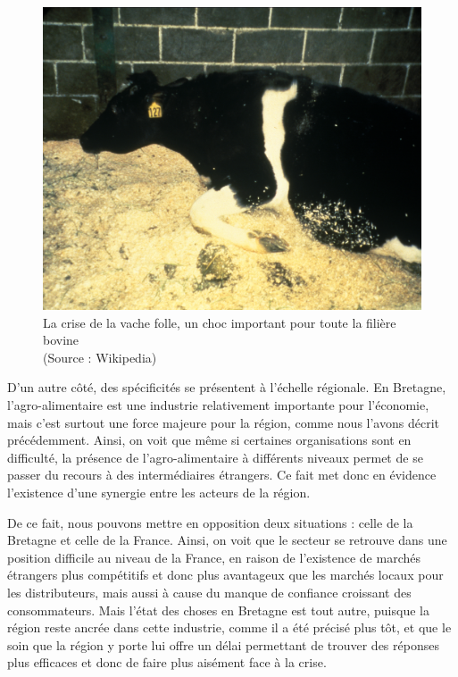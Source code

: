 \documentclass[a4paper,12pt]{report}
\begin{document}
			\begin{figure}[!h]
			\centering
			\includegraphics[scale=0.5]{Illustrations/VacheFolle.jpg}
			\caption{La crise de la vache folle, un choc important pour toute la filière bovine\\(Source : Wikipedia)}
			\label{VacheFolle}
			\end{figure}
			
			D’un autre côté, des spécificités se présentent à l’échelle régionale. En Bretagne, l’agro-alimentaire est une industrie relativement importante pour l’économie, mais c’est surtout une force majeure pour la région, comme nous l'avons décrit précédemment. Ainsi, on voit que même si certaines organisations sont en difficulté, la présence de l’agro-alimentaire à différents niveaux permet de se passer du recours à des intermédiaires étrangers. Ce fait met donc en évidence l’existence d’une synergie entre les acteurs de la région.

			De ce fait, nous pouvons mettre en opposition deux situations : celle de la Bretagne et celle de la France. Ainsi, on voit que le secteur se retrouve dans une position difficile au niveau de la France, en raison de l’existence de marchés étrangers plus compétitifs et donc plus avantageux que les marchés locaux pour les distributeurs, mais aussi à cause du manque de confiance croissant des consommateurs. Mais l’état des choses en Bretagne est tout autre, puisque la région reste ancrée dans cette industrie, comme il a été précisé plus tôt, et que le soin que la région y porte lui offre un délai permettant de trouver des réponses plus efficaces et donc de faire plus aisément face à la crise.
\end{document}

